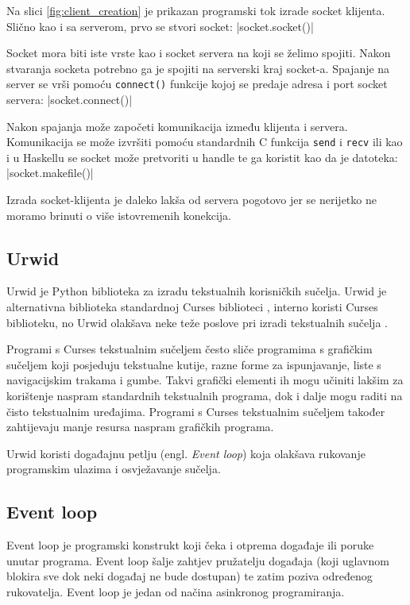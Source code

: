 Na slici \ref{fig:client_creation} je prikazan programski tok izrade socket
klijenta. Slično kao i sa serverom, prvo se stvori socket:
|socket.socket()|

Socket mora biti iste vrste kao i socket servera na koji se želimo spojiti.
Nakon stvaranja socketa potrebno ga je spojiti na serverski kraj socket-a.
Spajanje na server se vrši pomoću \texttt{connect()} funkcije kojoj se
predaje adresa i port socket servera:
|socket.connect()|

Nakon spajanja može započeti komunikacija između klijenta i servera.
Komunikacija se može izvršiti pomoću standardnih C funkcija \texttt{send}
i \texttt{recv} ili kao i u Haskellu se socket može pretvoriti u handle
te ga koristit kao da je datoteka:
|socket.makefile()|

Izrada socket-klijenta je daleko lakša od servera pogotovo jer se nerijetko ne
moramo brinuti o više istovremenih konekcija.

\newpage
\subsection{Urwid}

Urwid je Python biblioteka za izradu tekstualnih korisničkih sučelja. Urwid je
alternativna biblioteka standardnoj Curses biblioteci \cite{curses}, interno
koristi Curses biblioteku, no Urwid olakšava neke teže poslove pri izradi
tekstualnih sučelja \cite{urwid}.

Programi s Curses tekstualnim sučeljem često sliče programima s grafičkim
sučeljem koji posjeduju tekstualne kutije, razne forme za ispunjavanje, liste
s navigacijskim trakama i gumbe. Takvi grafički elementi ih mogu učiniti
lakšim za korištenje naspram standardnih tekstualnih programa, dok i dalje mogu
raditi na čisto tekstualnim uređajima. Programi s Curses tekstualnim sučeljem
također zahtijevaju manje resursa naspram grafičkih programa.

Urwid koristi događajnu petlju (engl. \emph{Event loop}) koja olakšava
rukovanje programskim ulazima i osvježavanje sučelja.

\subsection{Event loop}

Event loop je programski konstrukt koji čeka i otprema događaje ili poruke
unutar programa. Event loop šalje zahtjev pružatelju događaja (koji uglavnom
blokira sve dok neki događaj ne bude dostupan) te zatim poziva određenog
rukovatelja. Event loop je jedan od načina asinkronog programiranja.

